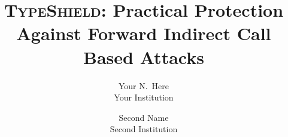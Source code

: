 \documentclass[sigconf, anonymous]{acmart}
\begin{document}

\title{\textsc{TypeShield}: Practical Protection Against Forward Indirect Call Based Attacks}


\author{
{\rm Your N.\ Here}\\
Your Institution
\and
{\rm Second Name}\\
Second Institution
} %



\thispagestyle{plain}
\pagestyle{plain}

\thispagestyle{empty}


\begin{abstract}
 
\end{abstract}


\maketitle
	











\listoftodos







% 
\end{document}
